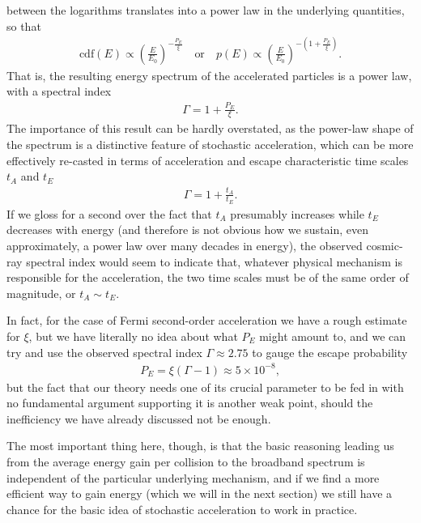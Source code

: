 between the logarithms translates into a power law in the underlying quantities, so that
\begin{align*}
  \text{cdf}(E) \propto  \left( \frac{E}{E_0} \right)^{-\frac{P_E}{\xi}}
  \quad\text{or}\quad
  p(E) \propto \left( \frac{E}{E_0} \right)^{-\left(1 + \frac{P_E}{\xi}\right)}.
\end{align*}
That is, the resulting energy spectrum of the accelerated particles is a power law, with
a spectral index
\begin{align}
  \Gamma = 1 + \frac{P_E}{\xi}.
\end{align}
The importance of this result can be hardly overstated, as the power-law shape of the
spectrum is a distinctive feature of stochastic acceleration, which can be more
effectively re-casted in terms of acceleration and escape characteristic time scales
$t_A$ and $t_E$
\begin{align}\label{eq:cr_stochastic_index}
  \Gamma = 1 + \frac{t_A}{t_E}.
\end{align}
If we gloss for a second over the fact that $t_A$ presumably increases while $t_E$
decreases with energy (and therefore is not obvious how we sustain, even approximately,
a power law over many decades in energy), the observed cosmic-ray spectral index would
seem to indicate that, whatever physical mechanism is responsible for the acceleration,
the two time scales must be of the same order of magnitude, or $t_A \sim t_E$.

In fact, for the case of Fermi second-order acceleration we have a rough estimate
for $\xi$, but we have literally no idea about what $P_E$ might amount to, and we can
try and use the observed spectral index $\Gamma \approx 2.75$ to gauge the escape
probability
\begin{align*}
  P_E = \xi (\Gamma - 1) \approx 5 \times 10^{-8},
\end{align*}
but the fact that our theory needs one of its crucial parameter to be fed in with
no fundamental argument supporting it is another weak point, should the inefficiency
we have already discussed not be enough.

The most important thing here, though, is that the basic reasoning leading us from
the average energy gain per collision to the broadband spectrum is independent of
the particular underlying mechanism, and if we find a more efficient way to gain
energy (which we will in the next section) we still have a chance for the basic
idea of stochastic acceleration to work in practice.


